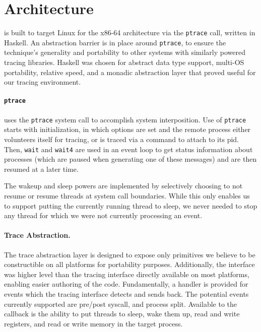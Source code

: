 \section{Architecture}
\label{tach:sec:impl}

\tachyon is built to target Linux for the x86-64 architecture via the
\texttt{ptrace} call, written in Haskell.  An abstraction barrier is
in place around \texttt{ptrace}, to ensure the technique's generality
and portability to other systems with similarly powered tracing
libraries.  Haskell was chosen for abstract data type support,
multi-OS portability, relative speed, and a monadic abstraction layer
that proved useful for our tracing environment.  

\paragraph{\texttt{ptrace}}
\tachyon uses the \texttt{ptrace} system call to accomplish system
interposition.  Use of \texttt{ptrace} starts with initialization, in
which options are set and the remote process either volunteers itself
for tracing, or is traced via a command to attach to its pid. Then,
\texttt{wait} and \texttt{wait4} are used in an event loop to get
status information about processes (which are paused when generating
one of these messages) and are then resumed at a later time.

The wakeup and sleep powers are implemented by selectively choosing to
not resume or resume threads at system call boundaries. While this
only enables us to support putting the currently running thread to
sleep, we never needed to stop any thread for which we were not
currently processing an event.

\paragraph{Trace Abstraction.}
The trace abstraction layer is designed to expose only primitives we
believe to be constructible on all platforms for portability purposes.
Additionally, the interface was higher level than the tracing
interface directly available on most platforms, enabling easier
authoring of the code. Fundamentally, a handler is provided for
events which the tracing interface detects and sends back. The potential
events currently supported are pre/post syscall, and process
split. Available to the callback is the ability to put threads to sleep,
wake them up, read and write registers, and read or write memory in
the target process.

